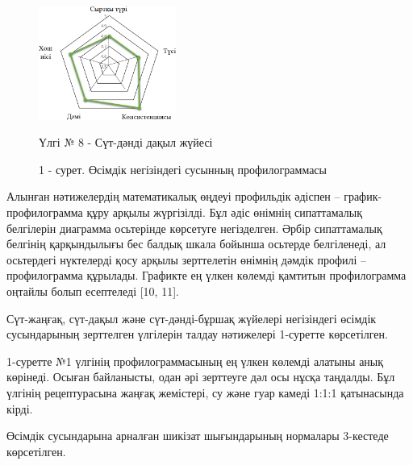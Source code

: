 \begin{figure}[H]
	\centering
	\includegraphics[width=0.4\textwidth]{media/pish2/image8}
	\caption*{Үлгі № 8 - Сүт-дәнді дақыл жүйесі}
	\caption*{1 - сурет. Өсімдік негізіндегі сусынның профилограммасы}
\end{figure}

\begin{multicols}{2}
Алынған нәтижелердің математикалық өңдеуі профильдік әдіспен --
график-профилограмма құру арқылы жүргізілді. Бұл әдіс өнімнің
сипаттамалық белгілерін диаграмма осьтерінде көрсетуге негізделген.
Әрбір сипаттамалық белгінің қарқындылығы бес балдық шкала бойынша
осьтерде белгіленеді, ал осьтердегі нүктелерді қосу арқылы зерттелетін
өнімнің дәмдік профилі -- профилограмма құрылады. Графикте ең үлкен
көлемді қамтитын профилограмма оңтайлы болып есептеледі {[}10, 11{]}.

Сүт-жаңғақ, сүт-дақыл және сүт-дәнді-бұршақ жүйелері негізіндегі өсімдік
сусындарының зерттелген үлгілерін талдау нәтижелері 1-суретте
көрсетілген.

1-суретте №1 үлгінің профилограммасының ең үлкен көлемді алатыны анық
көрінеді. Осыған байланысты, одан әрі зерттеуге дәл осы нұсқа таңдалды.
Бұл үлгінің рецептурасына жаңғақ жемістері, су және гуар камеді 1:1:1
қатынасында кірді.

Өсімдік сусындарына арналған шикізат шығындарының нормалары 3-кестеде
көрсетілген.
\end{multicols}

